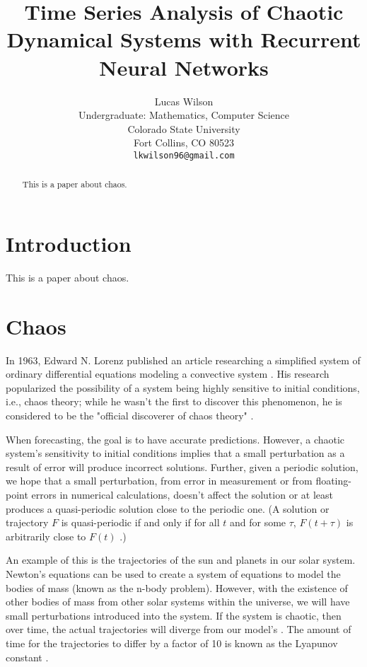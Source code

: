 \documentclass{article}
\title{Time Series Analysis of Chaotic Dynamical Systems with Recurrent Neural Networks}
\author{
  Lucas Wilson \\
  Undergraduate: Mathematics, Computer Science \\
  Colorado State University\\
  Fort Collins, CO 80523 \\
  \texttt{lkwilson96@gmail.com} \\
}
\begin{document}
\maketitle

\begin{abstract}
This is a paper about chaos.
\end{abstract}

\section{Introduction}

This is a paper about chaos.

\section{Chaos}

In 1963, Edward N. Lorenz published an article researching a simplified system of 
ordinary differential equations modeling a convective system \cite{lorenz1963deterministic}. His 
research popularized the possibility of a system being highly sensitive to 
initial conditions, i.e., chaos theory; while he wasn't the first to discover 
this phenomenon, he is considered to be the "official discoverer of chaos 
theory" \cite{oestreicher2007history}.

When forecasting, the goal is to have accurate predictions. However, 
a chaotic system's sensitivity to initial conditions implies that a small 
perturbation as a result of error will produce incorrect solutions.
Further, given a periodic
solution, we hope that a small perturbation, from error in measurement or from 
floating-point errors in numerical calculations, doesn't affect the solution or 
at least produces a quasi-periodic solution close to the periodic one. 
(A solution or trajectory $F$ 
is quasi-periodic if and only if for all $t$ and for some $\tau$, $F(t+\tau)$ 
is arbitrarily close to $F(t)$ \cite{lorenz1963deterministic}.)

An example of this is the trajectories of the sun and planets in our solar 
system. Newton's equations can be used to create a system of equations to model 
the bodies of mass (known as the n-body problem). However, with the existence of
other bodies of mass from other solar systems within the universe, we will have 
small perturbations introduced into the system. If the system is chaotic, then 
over time, the actual trajectories will diverge from our model's 
\cite{oestreicher2007history}. The amount of time for the trajectories to differ
by a factor of 10 is known as the Lyapunov constant 
\cite{oestreicher2007history}. 
\end{document}

